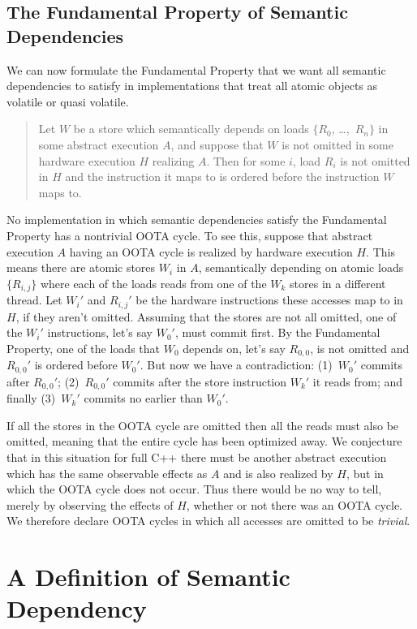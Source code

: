 \subsection{The Fundamental Property of Semantic Dependencies}
\label{sec:The Fundamental Property of Semantic Dependencies}

We can now formulate the Fundamental Property that we want all semantic
dependencies to satisfy in implementations that treat all atomic objects
as volatile or quasi volatile.
\begin{quote}
Let $W$ be a store which semantically depends on loads
$\{R_0$, \ldots,~$R_n\}$ in some abstract execution $A$,
and suppose that $W$ is not
omitted in some hardware execution $H$ realizing $A$.
Then for some $i$, load $R_i$ is not omitted in $H$ and the
instruction it maps to is ordered before the instruction $W$ maps to.
\end{quote}

No implementation in which semantic dependencies satisfy the Fundamental
Property has a nontrivial OOTA cycle.
To see this, suppose that abstract execution $A$ having an OOTA cycle
is realized by hardware execution $H$.
This means there are atomic stores $W_i$ in $A$,
semantically depending on atomic loads
$\{R_{i,j}\}$ where each of the loads reads from one of the $W_k$
stores in a different thread.
Let $W_i'$ and $R_{i,j}'$ be the hardware instructions these accesses
map to in $H$, if they aren't omitted.
Assuming that the stores are not all omitted,
one of the $W_i'$ instructions, let's say $W_0'$, must commit first.
By the Fundamental Property, one of the loads that $W_0$ depends on,
let's say $R_{0,0}$, is not omitted and $R_{0,0}'$ is ordered before $W_0'$.
But now we have a contradiction:
(1)~$W_0'$ commits after $R_{0,0}'$;
(2)~$R_{0,0}'$ commits after the store instruction $W_k'$ it reads from;
and finally
(3)~$W_k'$ commits no earlier than $W_0'$.

If all the stores in the OOTA cycle are omitted then all the reads must
also be omitted, meaning that the entire cycle has been optimized away.
We conjecture that in this situation for full C++ there must be another
abstract execution which has the same observable effects as $A$ and is
also realized by $H$, but in which the OOTA cycle does not occur.
Thus there would be no way to tell, merely by observing the effects of
$H$, whether or not there was an OOTA cycle.
We therefore declare OOTA cycles in which all accesses are omitted to
be \emph{trivial}.

\section{A Definition of Semantic Dependency}
\label{sec:A Definition of Semantic Dependency}

